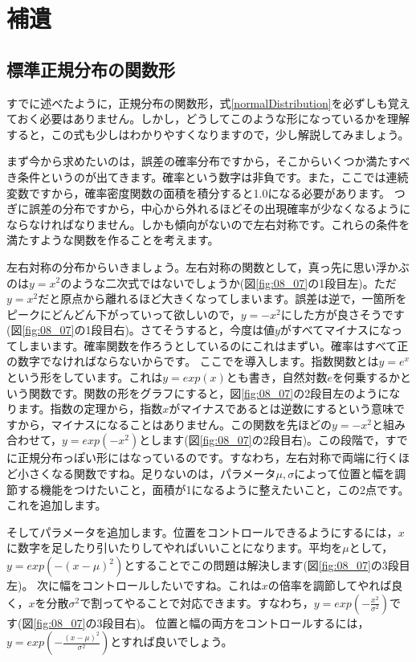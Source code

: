 \documentclass{ltjbook}
\begin{document}
\newpage
\section{補遺}
\subsection{標準正規分布の関数形}
すでに述べたように，正規分布の関数形，式\ref{normalDistribution}を必ずしも覚えておく必要はありません。しかし，どうしてこのような形になっているかを理解すると，この式も少しはわかりやすくなりますので，少し解説してみましょう。

まず今から求めたいのは，誤差の確率分布ですから，そこからいくつか満たすべき条件というのが出てきます。確率という数字は非負です。また，ここでは連続変数ですから，確率密度関数の面積を積分すると1.0になる必要があります。
つぎに誤差の分布ですから，中心から外れるほどその出現確率が少なくなるようにならなければなりません。しかも傾向がないので左右対称です。これらの条件を満たすような関数を作ることを考えます。

左右対称の分布からいきましょう。左右対称の関数として，真っ先に思い浮かぶのは$y=x^2$のような二次式ではないでしょうか(図\ref{fig:08_07}の1段目左)。ただ$y=x^2$だと原点から離れるほど大きくなってしまいます。誤差は逆で，一箇所をピークにどんどん下がっていって欲しいので，$y=-x^2$にした方が良さそうです(図\ref{fig:08_07}の1段目右)。さてそうすると，今度は値$y$がすべてマイナスになってしまいます。確率関数を作ろうとしているのにこれはまずい。確率はすべて正の数字でなければならないからです。
ここでを導入します。指数関数とは$y=e^x$という形をしています。これは$y=exp(x)$とも書き，自然対数$e$を何乗するかという関数です\footnotemark。関数の形をグラフにすると，図\ref{fig:08_07}の2段目左のようになります。指数の定理から，指数$x$がマイナスであるとは逆数にするという意味ですから，マイナスになることはありません\footnotemark。この関数を先ほどの$y=-x^2$と組み合わせて，$y=exp(-x^2)$とします(図\ref{fig:08_07}の2段目右)。この段階で，すでに正規分布っぽい形にはなっているのです。すなわち，左右対称で両端に行くほど小さくなる関数ですね。足りないのは，パラメータ$\mu,\sigma$によって位置と幅を調節する機能をつけたいこと，面積が1になるように整えたいこと，この2点です。これを追加します。

そしてパラメータを追加します。位置をコントロールできるようにするには，$x$に数字を足したり引いたりしてやればいいことになります。平均を$\mu$として，$y=exp(-(x-\mu)^2)$とすることでこの問題は解決します(図\ref{fig:08_07}の3段目左)。
次に幅をコントロールしたいですね。これは$x$の倍率を調節してやれば良く，$x$を分散$\sigma^2$で割ってやることで対応できます。すなわち，$y=exp(-\frac{x^2}{\sigma^2})$です(図\ref{fig:08_07}の3段目右)。
位置と幅の両方をコントロールするには，$y=exp(-\frac{(x-\mu)^2}{\sigma^2})$とすれば良いでしょう。
\end{document}
